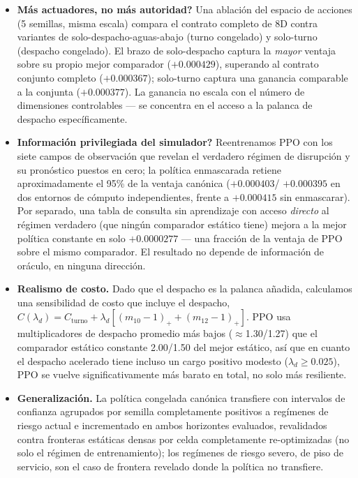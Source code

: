 \documentclass[11pt]{article}
\begin{document}
\begin{itemize}
\item \textbf{\textquestiondown Más actuadores, no más autoridad?} Una ablación del espacio
de acciones (5 semillas, misma escala) compara el contrato completo de 8D
contra variantes de solo-despacho-aguas-abajo (turno congelado) y
solo-turno (despacho congelado). El brazo de solo-despacho captura la
\emph{mayor} ventaja sobre su propio mejor comparador ($+0.000429$),
superando al contrato conjunto completo ($+0.000367$); solo-turno captura
una ganancia comparable a la conjunta ($+0.000377$). La ganancia no
escala con el número de dimensiones controlables --- se concentra en el
acceso a la palanca de despacho específicamente.
\item \textbf{\textquestiondown Información privilegiada del simulador?} Reentrenamos PPO
con los siete campos de observación que revelan el verdadero régimen de
disrupción y su pronóstico puestos en cero; la política enmascarada
retiene aproximadamente el 95\% de la ventaja canónica ($+0.000403$/
$+0.000395$ en dos entornos de cómputo independientes, frente a
$+0.000415$ sin enmascarar). Por separado, una tabla de consulta sin
aprendizaje con acceso \emph{directo} al régimen verdadero (que ningún
comparador estático tiene) mejora a la mejor política constante en solo
$+0.0000277$ --- una fracción de la ventaja de PPO sobre el mismo
comparador. El resultado no depende de información de oráculo, en
ninguna dirección.
\item \textbf{Realismo de costo.} Dado que el despacho es la palanca
añadida, calculamos una sensibilidad de costo que incluye el despacho,
$C(\lambda_d) = C_{\mathrm{turno}} + \lambda_d[(m_{10}-1)_+ + (m_{12}-1)_+]$.
PPO usa multiplicadores de despacho promedio más bajos ($\approx$1.30/1.27)
que el comparador estático constante 2.00/1.50 del mejor estático, así que
en cuanto el despacho acelerado tiene incluso un cargo positivo modesto
($\lambda_d \geq 0.025$), PPO se vuelve significativamente más barato en
total, no solo más resiliente.
\item \textbf{Generalización.} La política congelada canónica transfiere
con intervalos de confianza agrupados por semilla completamente positivos
a regímenes de riesgo actual e incrementado en ambos horizontes evaluados,
revalidados contra fronteras estáticas densas por celda completamente
re-optimizadas (no solo el régimen de entrenamiento); los regímenes de
riesgo severo, de piso de servicio, son el caso de frontera revelado donde
la política no transfiere.
\end{itemize}
\end{document}
